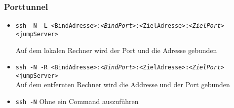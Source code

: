 \begin{frame}
\frametitle{Porttunnel}
\begin{itemize}
\item \texttt{ssh -N -L <BindAdresse>:\textit{<BindPort>}:<ZielAdresse>:\textit{<ZielPort>} <jumpServer> }

Auf dem lokalen Rechner wird der Port und die Adresse gebunden
\pause
\item \texttt{ssh -N -R <BindAdresse>:\textit{<BindPort>}:<ZielAdresse>:\textit{<ZielPort>} <jumpServer>}\\
Auf dem entfernten Rechner wird die Addresse und der Port gebunden
\pause
\item \texttt{ssh -N} Ohne ein Command auszuführen
\end{itemize}
\end{frame}